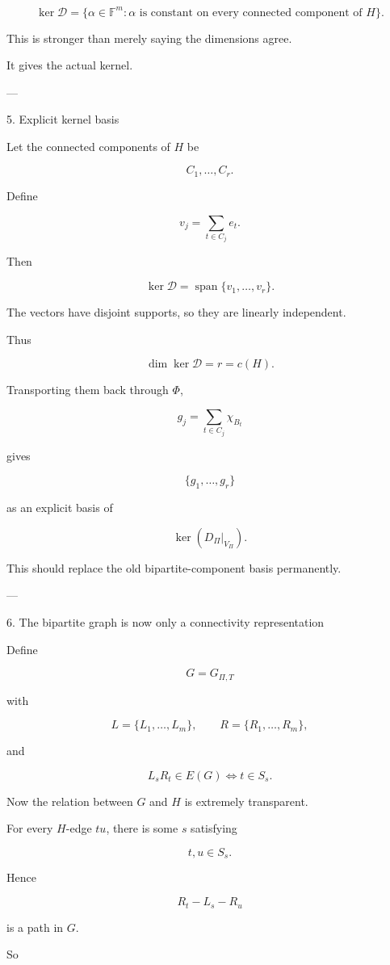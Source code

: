 \[
\boxed{
\ker\mathcal D
=
\{\alpha\in\mathbb F^m:
\alpha\text{ is constant on every connected component of }H\}.
}
\]

This is stronger than merely saying the dimensions agree.

It gives the actual kernel.


---

5. Explicit kernel basis

Let the connected components of \(H\) be

\[
C_1,\ldots,C_r.
\]

Define

\[
v_j
=
\sum_{t\in C_j}e_t.
\]

Then

\[
\boxed{
\ker\mathcal D
=
\operatorname{span}\{v_1,\ldots,v_r\}.
}
\]

The vectors have disjoint supports, so they are linearly independent.

Thus

\[
\boxed{
\dim\ker\mathcal D=r=c(H).
}
\]

Transporting them back through \(\Phi\),

\[
g_j
=
\sum_{t\in C_j}\chi_{B_t}
\]

gives

\[
\boxed{
\{g_1,\ldots,g_r\}
}
\]

as an explicit basis of

\[
\ker(D_\Pi|_{V_\Pi}).
\]

This should replace the old bipartite-component basis permanently.


---

6. The bipartite graph is now only a connectivity representation

Define

\[
G=G_{\Pi,T}
\]

with

\[
L=\{L_1,\ldots,L_m\},
\qquad
R=\{R_1,\ldots,R_m\},
\]

and

\[
L_sR_t\in E(G)
\iff
t\in S_s.
\]

Now the relation between \(G\) and \(H\) is extremely transparent.

For every \(H\)-edge \(tu\), there is some \(s\) satisfying

\[
t,u\in S_s.
\]

Hence

\[
R_t-L_s-R_u
\]

is a path in \(G\).

So

